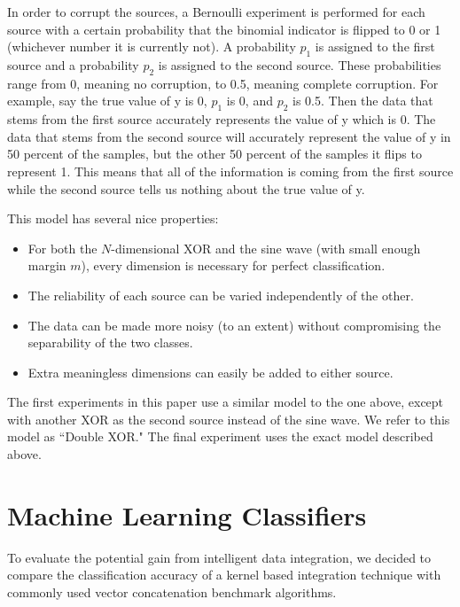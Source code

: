 \documentclass{article}
\begin{document}
In order to corrupt the sources, a Bernoulli experiment is performed for each
source with a certain probability that the binomial indicator is flipped to 0
or 1 (whichever number it is currently not). A probability $p_1$ is assigned to
the first source and a probability $p_2$ is assigned to the second source.
These probabilities range from 0, meaning no corruption, to 0.5, meaning
complete corruption. For example, say the true value of y is 0, $p_1$ is 0, and
$p_2$ is 0.5. Then the data that stems from the first source accurately
represents the value of y which is 0. The data that stems from the second
source will accurately represent the value of y in 50 percent of the samples,
but the other 50 percent of the samples it flips to represent 1. This means
that all of the information is coming from the first source while the second
source tells us nothing about the true value of y.

This model has several nice properties:
\begin{itemize}
    \item For both the $N$-dimensional XOR and the sine wave (with small enough
        margin $m$), every dimension is necessary for perfect classification.
    \item The reliability of each source can be varied independently of the
        other.
    \item The data can be made more noisy (to an extent) without
        compromising the separability of the two classes.
    \item Extra meaningless dimensions can easily be added to either source.
\end{itemize}

The first experiments in this paper use a similar model to the one above,
except with another XOR as the second source instead of the sine wave. We refer
to this model as ``Double XOR." The final experiment uses the exact model described
above.











\section*{Machine Learning Classifiers}

To evaluate the potential gain from intelligent data integration, we decided to
compare the classification accuracy of a kernel based integration technique
with commonly used vector concatenation benchmark algorithms.
\end{document}
